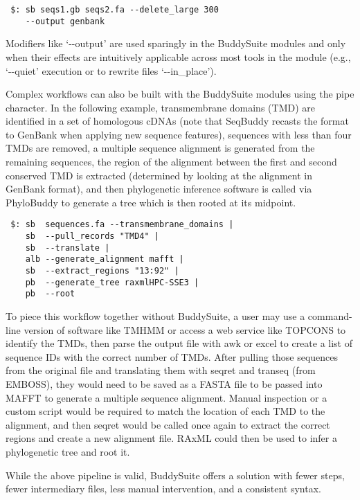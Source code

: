 \documentclass[nogrid]{MBE_article}%
\begin{document}
\smallskip

{\small
\begin{verbatim}
 $: sb seqs1.gb seqs2.fa --delete_large 300
    --output genbank
\end{verbatim}
}
\smallskip

Modifiers like `-{}-output' are used sparingly in the BuddySuite modules and only when their effects are intuitively applicable across most tools in the module (e.g., `-{}-quiet' execution or to rewrite files `-{}-in\_place').

Complex workflows can also be built with the BuddySuite modules using the pipe character. In the following example, transmembrane domains (TMD) are identified in a set of homologous cDNAs (note that SeqBuddy recasts the format to GenBank when applying new sequence features), sequences with less than four TMDs are removed, a multiple sequence alignment is generated from the remaining sequences, the region of the alignment between the first and second conserved TMD is extracted (determined by looking at the alignment in GenBank format), and then phylogenetic inference software is called via PhyloBuddy to generate a tree which is then rooted at its midpoint.

\smallskip
{\small
\begin{verbatim}
 $: sb  sequences.fa --transmembrane_domains |
    sb  --pull_records "TMD4" |
    sb  --translate |
    alb --generate_alignment mafft |
    sb  --extract_regions "13:92" |
    pb  --generate_tree raxmlHPC-SSE3 |
    pb  --root
\end{verbatim}
}

\smallskip

To piece this workflow together without BuddySuite, a user may use a command-line version of software like TMHMM \cite{Krogh:2001bv} or access a web service like TOPCONS \cite{Tsirigos:2015eo} to identify the TMDs, then parse the output file with awk or excel to create a list of sequence IDs with the correct number of TMDs. After pulling those sequences from the original file and translating them with seqret and transeq (from EMBOSS), they would need to be saved as a FASTA file to be passed into MAFFT to generate a multiple sequence alignment. Manual inspection or a custom script would be required to match the location of each TMD to the alignment, and then seqret would be called once again to extract the correct regions and create a new alignment file. RAxML could then be used to infer a phylogenetic tree and root it. 

While the above pipeline is valid, BuddySuite offers a solution with fewer steps, fewer intermediary files, less manual intervention, and a consistent syntax. 
\end{document}
